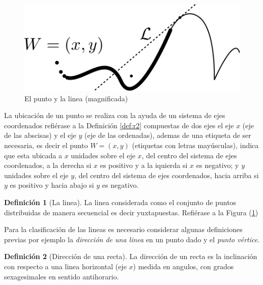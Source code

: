 \documentclass[16pt,]{krantz}
\theoremstyle{definition}
\newtheorem{definition}{Definición}[chapter]
\theoremstyle{definition}
\theoremstyle{definition}
\theoremstyle{definition}
\theoremstyle{remark}
\begin{document}
\begin{figure}[!ht]

{\centering \includegraphics{puntolinea} 

}

\caption{El punto y la linea (magnificada)}\label{fig:puntolinea}
\end{figure}

La ubicación de un punto se realiza con la ayuda de un sistema de ejes coordenados refiérase a la Definición \ref{def:r2} compuestas de dos ejes el eje \(x\) (eje de las abscisas) y el eje \(y\) (eje de las ordenadas), ademas de una etiqueta de ser necesaria, es decir el punto \(W=(x,y)\) (etiquetas con letras mayúsculas), indica que esta ubicada a \(x\) unidades sobre el eje \(x\), del centro del sistema de ejes coordenados, a la derecha si \(x\) es positivo y a la iquierda si \(x\) es negativo; y \(y\) unidades sobre el eje \(y\), del centro del sistema de ejes coordenados, hacia arriba si \(y\) es positivo y hacia abajo si \(y\) es negativo.

\begin{definition}[La linea]
\protect\hypertarget{def:linea}{}{\label{def:linea} {} }La linea considerada como el conjunto de puntos distribuidas de manera secuencial es decir yuxtapuestas. Refiérase a la Figura (\ref{fig:puntolinea})
\end{definition}

Para la clasificación de las lineas es necesario considerar algunas definiciones previas por ejemplo la \emph{dirección de una linea} en un punto dado y el \emph{punto vértice}.

\begin{definition}[Dirección de una recta]
\protect\hypertarget{def:direccionrecta}{}{\label{def:direccionrecta} {} }La dirección de un recta es la inclinación con respecto a una linea horizontal (eje \(x\)) medida en angulos, con grados sexagesimales en sentido antihorario.
\end{definition}
\end{document}
